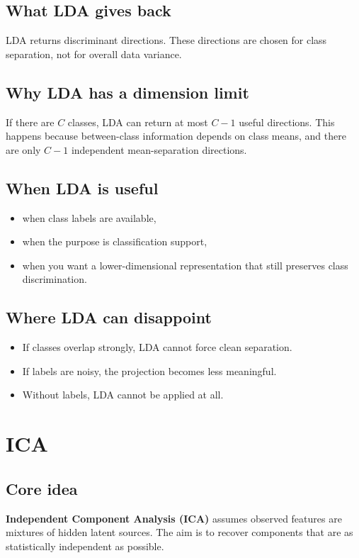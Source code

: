 \documentclass[11pt]{article}
\begin{document}
\subsection{What LDA gives back}
LDA returns discriminant directions.
These directions are chosen for class separation, not for overall data variance.

\subsection{Why LDA has a dimension limit}
If there are $C$ classes, LDA can return at most $C-1$ useful directions.
This happens because between-class information depends on class means, and there are only $C-1$ independent mean-separation directions.

\subsection{When LDA is useful}
\begin{itemize}[leftmargin=*]
  \item when class labels are available,
  \item when the purpose is classification support,
  \item when you want a lower-dimensional representation that still preserves class discrimination.
\end{itemize}

\subsection{Where LDA can disappoint}
\begin{itemize}[leftmargin=*]
  \item If classes overlap strongly, LDA cannot force clean separation.
  \item If labels are noisy, the projection becomes less meaningful.
  \item Without labels, LDA cannot be applied at all.
\end{itemize}

\section{ICA}
\subsection{Core idea}
\textbf{Independent Component Analysis (ICA)} assumes observed features are mixtures of hidden latent sources.
The aim is to recover components that are as statistically independent as possible.
\end{document}
